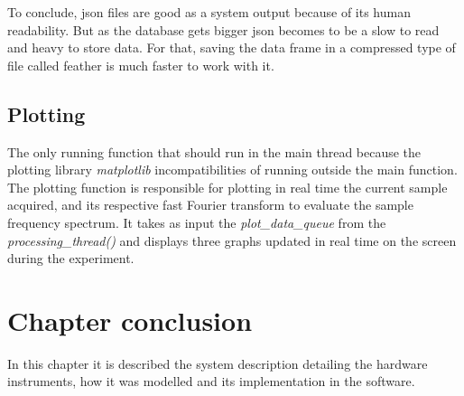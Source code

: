         To conclude, json files are good as a system output because of its human readability. But as the database gets bigger json becomes to be a slow to read and heavy to store data. For that, saving the data frame in a compressed type of file called feather is much faster to work with it.
    

    \subsection{Plotting}

        The only running function that should run in the main thread because the plotting library \emph{matplotlib} incompatibilities of running outside the main function. 
        The plotting function is responsible for plotting in real time the current sample acquired, and its respective fast Fourier transform to evaluate the sample frequency spectrum.
        It takes as input the \emph{plot\_data\_queue} from the \emph{processing\_thread()} and displays three graphs updated in real time on the screen during the experiment.

  \section{Chapter conclusion}

    In this chapter it is described the system description detailing the hardware instruments, how it was modelled and its implementation in the software. 


\clearpage